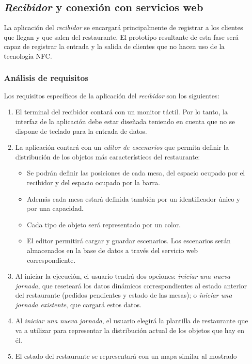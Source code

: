 \subsection{\emph{Recibidor} y conexión con servicios web}
La aplicación del \emph{recibidor} se encargará principalmente de registrar a
los clientes que llegan y que salen del restaurante. El prototipo resultante
de esta fase será capaz de registrar la entrada y la salida de clientes que no
hacen uso de la tecnología \acs{NFC}.

\subsubsection{Análisis de requisitos}
Los requisitos específicos de la aplicación del \emph{recibidor} son los
siguientes:
\begin{enumerate}
\item El terminal del recibidor contará con un monitor táctil. Por lo tanto, la 
interfaz de la aplicación debe estar diseñada teniendo en cuenta que no se
dispone de teclado para la entrada de datos.
\item La aplicación contará con un \emph{editor de escenarios} que permita
definir la distribución de los objetos más característicos del restaurante:
  \begin{itemize}
  \item Se podrán definir las posiciones de cada mesa, del espacio ocupado por
  el recibidor y del espacio ocupado por la barra.
  \item Además cada mesa estará definida también por un identificador único y
  por una capacidad.
  \item Cada tipo de objeto será representado por un color.
  \item El editor permitirá cargar y guardar escenarios. Los escenarios serán
  almacenados en la base de datos a través del servicio web correspondiente.
  \end{itemize}
\item Al iniciar la ejecución, el usuario tendrá dos opciones:
\emph{iniciar una nueva jornada}, que reseteará los datos dinámicos
correspondientes al estado anterior del restaurante (pedidos pendientes y
estado de las mesas); o \emph{iniciar una jornada existente}, que cargará
estos datos.
\item Al \emph{iniciar una nueva jornada}, el usuario elegirá la plantilla de
restaurante que va a utilizar para representar la distribución actual de los
objetos que hay en él.
\item El estado del restaurante se representará con un mapa similar al mostrado

\end{enumerate}
